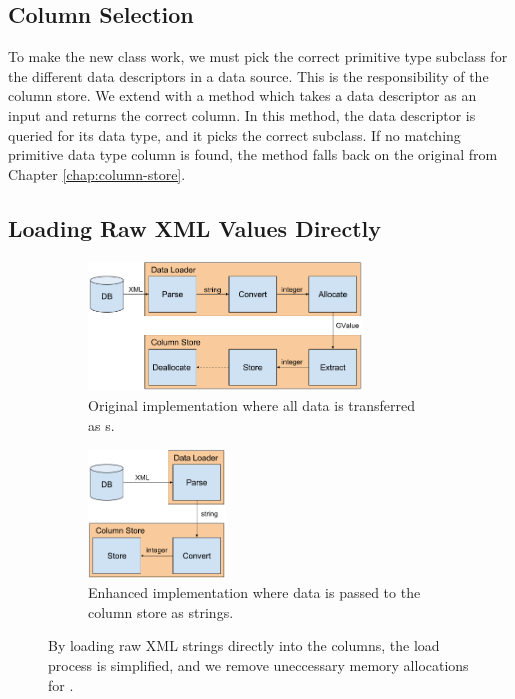 \subsection{Column Selection}
\label{sub:Column Selection}
To make the new  class work, we must pick the correct primitive type subclass for the different data descriptors in a data source. This is the responsibility of the column store. We extend  with a  method which takes a data descriptor as an input and returns the correct column. In this method, the data descriptor is queried for its data type, and it picks the correct  subclass. If no matching primitive data type column is found, the method falls back on the original  from Chapter \ref{chap:column-store}.

\subsection{Loading Raw XML Values Directly}
\label{storage-format:raw-xml}
\begin{figure}
    \centering
    \begin{subfigure}{\textwidth}
        \centering
        \includegraphics[width=0.8\textwidth]{img/gap-load-original.png}
        \caption{Original implementation where all data is transferred as s.}
    \end{subfigure}
    \begin{subfigure}{\textwidth}
        \centering
        \includegraphics[width=0.4\textwidth]{img/gap-load-raw.png}
        \caption{Enhanced implementation where data is passed to the column store as strings.}
    \end{subfigure}
\caption{By loading raw XML strings directly into the columns, the load process is simplified, and we remove uneccessary memory allocations for .}
\label{fig:gap-load-raw}
\end{figure}

